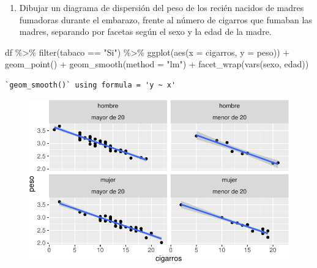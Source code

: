 \documentclass[
  a4paper,
]{scrreport}
\newenvironment{Shaded}{\begin{snugshade}}{\end{snugshade}}
\newcommand{\AttributeTok}[1]{\textcolor[rgb]{0.40,0.45,0.13}{#1}}
\newcommand{\FunctionTok}[1]{\textcolor[rgb]{0.28,0.35,0.67}{#1}}
\newcommand{\NormalTok}[1]{\textcolor[rgb]{0.00,0.23,0.31}{#1}}
\newcommand{\SpecialCharTok}[1]{\textcolor[rgb]{0.37,0.37,0.37}{#1}}
\newcommand{\StringTok}[1]{\textcolor[rgb]{0.13,0.47,0.30}{#1}}
\providecommand{\tightlist}{%
  \setlength{\itemsep}{0pt}\setlength{\parskip}{0pt}}\usepackage{longtable,booktabs,array}
\theoremstyle{definition}
\theoremstyle{definition}
\theoremstyle{remark}
\begin{document}
\begin{enumerate}
\def\labelenumi{\alph{enumi}.}
\setcounter{enumi}{7}
\tightlist
\item
  Dibujar un diagrama de dispersión del peso de los recién nacidos de
  madres fumadoras durante el embarazo, frente al número de cigarros que
  fumaban las madres, separando por facetas según el sexo y la edad de
  la madre.
\end{enumerate}

\begin{tcolorbox}[enhanced jigsaw, colbacktitle=quarto-callout-note-color!10!white, breakable, opacitybacktitle=0.6, left=2mm, opacityback=0, leftrule=.75mm, colframe=quarto-callout-note-color-frame, bottomrule=.15mm, toprule=.15mm, toptitle=1mm, colback=white, titlerule=0mm, title=\textcolor{quarto-callout-note-color}{\faInfo}\hspace{0.5em}{Solución}, rightrule=.15mm, arc=.35mm, bottomtitle=1mm, coltitle=black]

\begin{Shaded}
\begin{Highlighting}[]
\NormalTok{df }\SpecialCharTok{\%\textgreater{}\%} 
    \FunctionTok{filter}\NormalTok{(tabaco }\SpecialCharTok{==} \StringTok{"Si"}\NormalTok{) }\SpecialCharTok{\%\textgreater{}\%}
    \FunctionTok{ggplot}\NormalTok{(}\FunctionTok{aes}\NormalTok{(}\AttributeTok{x =}\NormalTok{ cigarros, }\AttributeTok{y =}\NormalTok{ peso)) }\SpecialCharTok{+}
        \FunctionTok{geom\_point}\NormalTok{() }\SpecialCharTok{+}
        \FunctionTok{geom\_smooth}\NormalTok{(}\AttributeTok{method =} \StringTok{"lm"}\NormalTok{) }\SpecialCharTok{+}
        \FunctionTok{facet\_wrap}\NormalTok{(}\FunctionTok{vars}\NormalTok{(sexo, edad))}
\end{Highlighting}
\end{Shaded}

\begin{verbatim}
`geom_smooth()` using formula = 'y ~ x'
\end{verbatim}

\begin{figure}[H]

{\centering \includegraphics{07-graficos_files/figure-pdf/unnamed-chunk-41-1.pdf}

}

\end{figure}

\end{tcolorbox}
\end{document}

